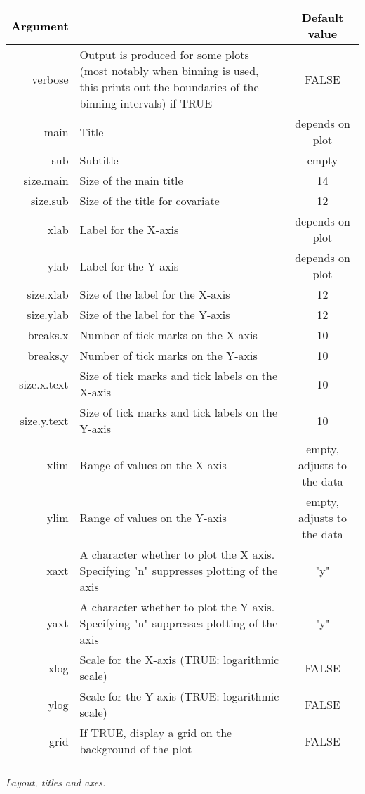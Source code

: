 \newpage

\begin{table}[!h] 
\begin{center}
\begin{tabular}{| r p{8cm} c|}
\hline
\textbf{\textcolor{black}{Argument}} & \centering{\textbf{\textcolor{black}{Description }}} & \textbf{\textcolor{black}{Default value}} \\
\hline
{\ttfamily verbose} & Output is produced for some plots (most notably when binning is used, this prints out the boundaries of the binning intervals) if TRUE & FALSE \\
{\ttfamily main} & Title & depends on plot \\
{\ttfamily sub } & Subtitle & empty \\
{\ttfamily size.main } & Size of the main title & 14 \\
{\ttfamily size.sub  } & Size of the title for covariate & 12 \\

{\ttfamily xlab} & Label for the X-axis & depends on plot \\
{\ttfamily ylab} & Label for the Y-axis & depends on plot \\
{\ttfamily size.xlab} & Size of the label for the X-axis & 12 \\
{\ttfamily size.ylab} & Size of the label for the Y-axis & 12 \\
{\ttfamily breaks.x} & Number of tick marks on the X-axis & 10 \\
{\ttfamily breaks.y} & Number of tick marks on the Y-axis & 10 \\
{\ttfamily size.x.text} & Size of tick marks and tick labels on the X-axis & 10 \\
{\ttfamily size.y.text} & Size of tick marks and tick labels on the Y-axis & 10 \\

{\ttfamily xlim} & Range of values on the X-axis & empty, adjusts to the data \\
{\ttfamily ylim} & Range of values on the Y-axis & empty, adjusts to the data \\

{\ttfamily xaxt} & A character whether to plot the X axis. Specifying "n" suppresses plotting of the axis & "y"  \\
{\ttfamily yaxt} & A character whether to plot the Y axis. Specifying "n" suppresses plotting of the axis & "y" \\

{\ttfamily xlog} & Scale for the X-axis (TRUE: logarithmic scale) & FALSE \\
{\ttfamily ylog} & Scale for the Y-axis (TRUE: logarithmic scale) & FALSE \\
 {\ttfamily grid } & If TRUE, display a grid on the background of the plot & FALSE \\
{\ttfamily } & &  \\
\hline
\end{tabular} 
\end{center}
 {\itshape Layout, titles and axes.}
\end{table} 


